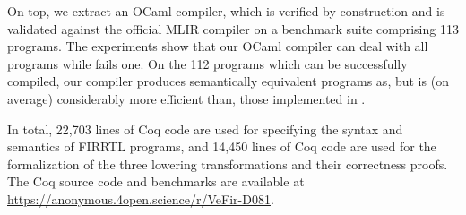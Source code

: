 On top, we extract an OCaml {\firrtl} compiler, which is verified by construction and is validated
against the official MLIR {\firrtl} compiler  %
on a benchmark suite comprising 113 {\firrtl} programs.
The experiments show that our OCaml compiler can deal with all programs while %
{\firtool} fails one. On the 112 programs which can be successfully compiled, our compiler produces semantically equivalent {\lofirrtl} programs as, but is (on average) considerably more efficient than, those implemented in {\firtool}.

In total, 22,703 lines of Coq code are used for specifying the syntax and semantics of FIRRTL programs, and 14,450 lines of Coq code are used for the formalization of the three lowering transformations and their correctness proofs.
The Coq source code and benchmarks are available at \url{https://anonymous.4open.science/r/VeFir-D081}.

%
%






